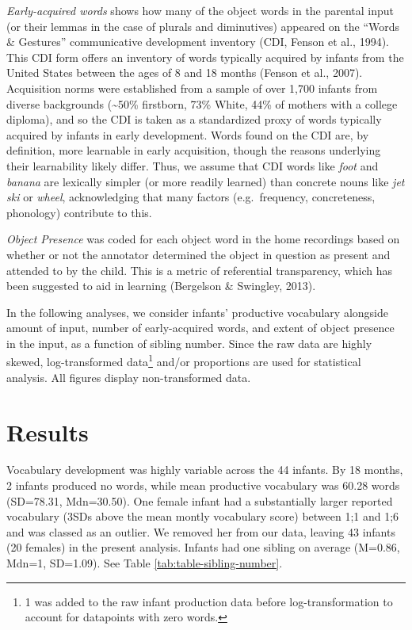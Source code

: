 \documentclass[man,floatsintext]{apa6}
\let\rmarkdownfootnote\footnote%
\def\footnote{\protect\rmarkdownfootnote}
\begin{document}
\emph{Early-acquired words} shows how many of the object words in the parental input (or their lemmas in the case of plurals and diminutives) appeared on the \enquote{Words \& Gestures} communicative development inventory (CDI, Fenson et al., 1994). This CDI form offers an inventory of words typically acquired by infants from the United States between the ages of 8 and 18 months (Fenson et al., 2007). Acquisition norms were established from a sample of over 1,700 infants from diverse backgrounds (\textasciitilde{}50\% firstborn, 73\% White, 44\% of mothers with a college diploma), and so the CDI is taken as a standardized proxy of words typically acquired by infants in early development. Words found on the CDI are, by definition, more learnable in early acquisition, though the reasons underlying their learnability likely differ. Thus, we assume that CDI words like \emph{foot} and \emph{banana} are lexically simpler (or more readily learned) than concrete nouns like \emph{jet ski} or \emph{wheel}, acknowledging that many factors (e.g.~frequency, concreteness, phonology) contribute to this.

\emph{Object Presence} was coded for each object word in the home recordings based on whether or not the annotator determined the object in question as present and attended to by the child. This is a metric of referential transparency, which has been suggested to aid in learning (Bergelson \& Swingley, 2013).

In the following analyses, we consider infants' productive vocabulary alongside amount of input, number of early-acquired words, and extent of object presence in the input, as a function of sibling number. Since the raw data are highly skewed, log-transformed data\footnote{1 was added to the raw infant production data before log-transformation to account for datapoints with zero words.} and/or proportions are used for statistical analysis. All figures display non-transformed data.

\hypertarget{results}{%
\section{Results}\label{results}}

Vocabulary development was highly variable across the 44 infants. By 18 months, 2 infants produced no words, while mean productive vocabulary was 60.28 words (SD=78.31, Mdn=30.50). One female infant had a substantially larger reported vocabulary (3SDs above the mean montly vocabulary score) between 1;1 and 1;6 and was classed as an outlier. We removed her from our data, leaving 43 infants (20 females) in the present analysis. Infants had one sibling on average (M=0.86, Mdn=1, SD=1.09). See Table \ref{tab:table-sibling-number}.
\end{document}
